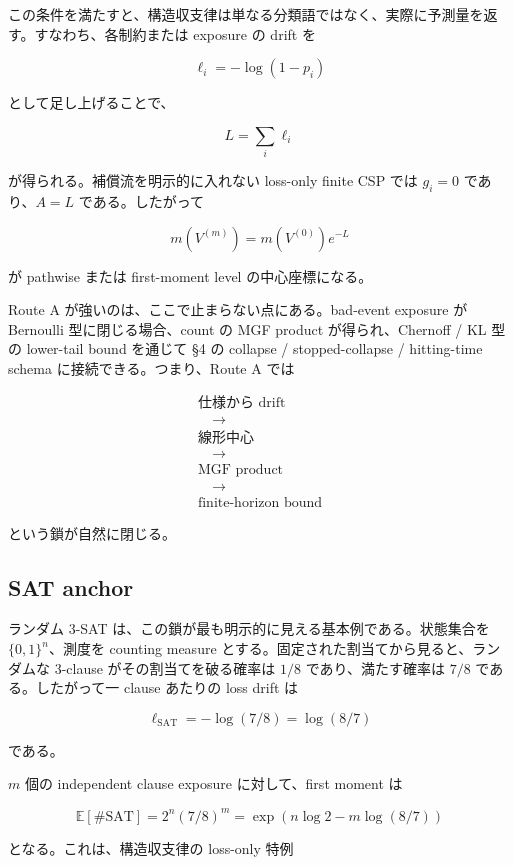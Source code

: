 \documentclass[12pt,a4paper]{article}
\begin{document}
この条件を満たすと、構造収支律は単なる分類語ではなく、実際に予測量を返す。すなわち、各制約または exposure の drift を

\[
\ell_{i} = -\log(1-p_{i})
\]

として足し上げることで、

\[
L = \sum_{i} \ell_{i}
\]

が得られる。補償流を明示的に入れない loss-only finite CSP では \(g_{i}=0\) であり、\(A=L\) である。したがって

\[
m(V^{(m)}) = m(V^{(0)})e^{-L}
\]

が pathwise または first-moment level の中心座標になる。

Route A が強いのは、ここで止まらない点にある。bad-event exposure が Bernoulli 型に閉じる場合、count の MGF product が得られ、Chernoff / KL 型の lower-tail bound を通じて §4 の collapse / stopped-collapse / hitting-time schema に接続できる。つまり、Route A では

\[
\begin{aligned}
\text{仕様から drift} \\
\quad\to\quad \\
\text{線形中心} \\
\quad\to\quad \\
\text{MGF product} \\
\quad\to\quad \\
\text{finite-horizon bound}
\end{aligned}
\]

という鎖が自然に閉じる。

\subsection{SAT anchor}\label{sat-anchor}

ランダム 3-SAT は、この鎖が最も明示的に見える基本例である。状態集合を \(\{0,1\}^n\)、測度を counting measure とする。固定された割当てから見ると、ランダムな 3-clause がその割当てを破る確率は \(1/8\) であり、満たす確率は \(7/8\) である。したがって一 clause あたりの loss drift は

\[
\ell_{\mathrm{SAT}} = -\log(7/8) = \log(8/7)
\]

である。

\(m\) 個の independent clause exposure に対して、first moment は

\[
\mathbb E[\#\mathrm{SAT}] = 2^n(7/8)^m = \exp(n\log 2 - m\log(8/7))
\]

となる。これは、構造収支律の loss-only 特例
\end{document}
